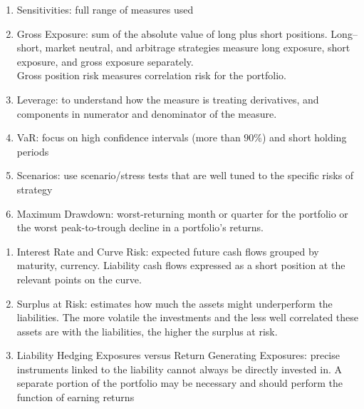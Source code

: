 \begin{remark} 
\begin{enumerate}[label=\roman*.]
\setlength{\itemsep}{0pt}
\item Sensitivities: full range of measures used
\item Gross Exposure: sum of the absolute value of long plus short positions. Long–short, market neutral, and arbitrage strategies measure long exposure, short exposure, and gross exposure separately.\\
Gross position risk measures correlation risk for the portfolio.
\item Leverage: to understand how the measure is treating derivatives, and components in numerator and denominator of the measure.
\item VaR: focus on high confidence intervals (more than $90\%$) and short holding periods
\item Scenarios: use scenario/stress tests that are well tuned to the specific risks of  strategy
\item Maximum Drawdown: worst-returning month or quarter for the portfolio or the worst peak-to-trough decline in a portfolio’s returns.
\end{enumerate}
\end{remark}

\begin{remark} 
\begin{enumerate}[label=\roman*.]
\setlength{\itemsep}{0pt}
\item Interest Rate and Curve Risk: expected future cash flows grouped by maturity, currency. Liability cash flows expressed as a short position at the relevant points on the curve.
\item Surplus at Risk: estimates how much the assets might underperform the liabilities. The more volatile the investments and the less well correlated these assets are with the liabilities, the higher the surplus at risk.
\item Liability Hedging Exposures versus Return Generating Exposures: precise instruments linked to the liability cannot always be directly invested in. A separate portion of the portfolio may be necessary and should perform the function of earning returns
\end{enumerate}
\end{remark}

